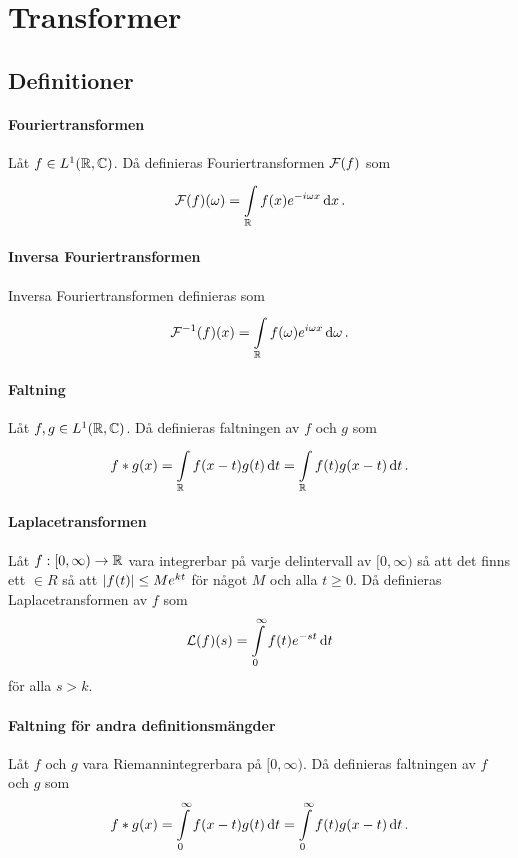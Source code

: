 \section{Transformer}

\subsection{Definitioner}

\paragraph{Fouriertransformen}
Låt $f\in L^{1}(\mathbb{R}, \mathbb{C})$. Då definieras Fouriertransformen $\mathcal{F}(f)$ som
\begin{align*}
	\mathcal{F}(f)(\omega) = \int\limits_{\mathbb{R}}^{}f(x)e^{-i\omega x}\dd{x}.
\end{align*}

\paragraph{Inversa Fouriertransformen}
Inversa Fouriertransformen definieras som
\begin{align*}
	\mathcal{F}^{-1}(f)(x) = \int\limits_{\mathbb{R}}^{}f(\omega)e^{i\omega x}\dd{\omega}.
\end{align*}

\paragraph{Faltning}
Låt $f, g\in L^{1}(\mathbb{R}, \mathbb{C})$. Då definieras faltningen av $f$ och $g$ som
\begin{align*}
	f * g(x) = \int\limits_{\mathbb{R}}^{}f(x - t)g(t)\dd{t} = \int\limits_{\mathbb{R}}^{}f(t)g(x - t)\dd{t}.
\end{align*}

\paragraph{Laplacetransformen}
Låt $f: [0, \infty)\to\mathbb{R}$ vara integrerbar på varje delintervall av $[0, \infty)$ så att det finns ett $\in R$ så att $\abs{f(t)}\leq Me^{kt}$ för något $M$ och alla $t \geq 0$. Då definieras Laplacetransformen av $f$ som
\begin{align*}
	\mathcal{L}(f)(s) = \int\limits_{0}^{\infty}f(t)e^{-st}\dd{t}
\end{align*}
för alla $s > k$.

\paragraph{Faltning för andra definitionsmängder}
Låt $f$ och $g$ vara Riemannintegrerbara på $[0, \infty)$. Då definieras faltningen av $f$ och $g$ som
\begin{align*}
	f * g(x) = \int\limits_{0}^{\infty}f(x - t)g(t)\dd{t} = \int\limits_{0}^{\infty}f(t)g(x - t)\dd{t}.
\end{align*}

